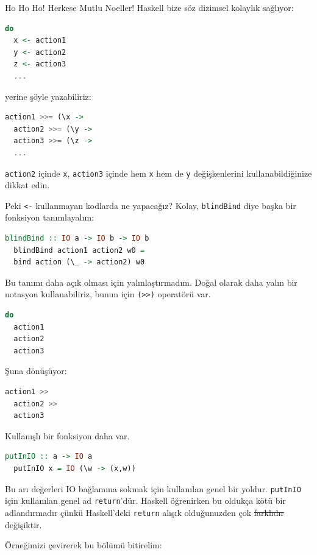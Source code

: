 \documentclass[a4paper,14pt,openany]{extbook} %
\begin{document}
Ho Ho Ho! Herkese Mutlu Noeller! Haskell bize söz dizimsel kolaylık
sağlıyor:

\begin{lstlisting}[language=Haskell]
  do
  x <- action1
  y <- action2
  z <- action3
  ...
\end{lstlisting}

yerine şöyle yazabiliriz:

\begin{lstlisting}[language=Haskell]
  action1 >>= (\x ->
  action2 >>= (\y ->
  action3 >>= (\z ->
  ...
\end{lstlisting}

\lstinline!action2! içinde \lstinline!x!, \lstinline!action3! içinde hem
\lstinline!x! hem de \lstinline!y! değişkenlerini kullanabildiğinize
dikkat edin.

Peki \lstinline!<-! kullanmayan kodlarda ne yapacağız? Kolay,
\lstinline!blindBind! diye başka bir fonksiyon tanımlayalım:

\begin{lstlisting}[language=Haskell]
  blindBind :: IO a -> IO b -> IO b
  blindBind action1 action2 w0 =
  bind action (\_ -> action2) w0
\end{lstlisting}

Bu tanımı daha açık olması için yalınlaştırmadım. Doğal olarak daha yalın bir
notasyon kullanabiliriz, bunun için \lstinline!(>>)! operatörü var.

\begin{lstlisting}[language=Haskell]
  do
  action1
  action2
  action3
\end{lstlisting}

Şuna dönüşüyor:

\begin{lstlisting}[language=Haskell]
  action1 >>
  action2 >>
  action3
\end{lstlisting}

Kullanışlı bir fonksiyon daha var.

\begin{lstlisting}[language=Haskell]
  putInIO :: a -> IO a
  putInIO x = IO (\w -> (x,w))
\end{lstlisting}

Bu arı değerleri IO bağlamına sokmak için kullanılan genel bir yoldur.
\lstinline!putInIO! için kullanılan genel ad \lstinline!return!'dür.
Haskell öğrenirken bu oldukça kötü bir adlandırmadır çünkü Haskell'deki
\lstinline!return! alışık olduğunuzden çok \st{farklıdır} değişiktir.

Örneğimizi çevirerek bu bölümü bitirelim:
\end{document}

